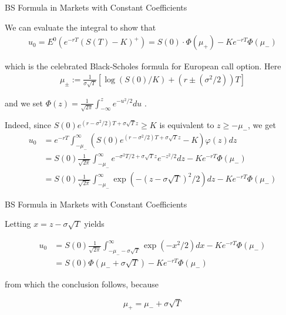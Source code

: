 \documentclass{beamer}
\begin{document}
\begin{frame}{BS Formula in Markets with Constant Coefficients}

    {\footnotesize \footnotesize
    \par We can evaluate the integral to show that
    \begin{align*}
        u_0 = E^0 \left( e^{-rT} (S(T) - K)^+ \right) = S(0) \cdot \Phi(\mu_+) - Ke^{-rT} \Phi(\mu_-)
    \end{align*}
    \par which is the celebrated Black-Scholes formula for European call option. Here
    \begin{align*}
        \mu_{\pm} := \frac{1}{\sigma\sqrt{T}} [\log(S(0)/K) + (r \pm (\sigma^2/2))T]
    \end{align*}
    \par and we set \( \Phi(z) = \frac{1}{\sqrt{2\pi}} \int_{-\infty}^{z} e^{-u^2/2} du \) .
    \par  \pause Indeed, since \( S(0)e^{(r-\sigma^2/2)T+\sigma\sqrt{T}z} \geq K \) is equivalent to \( z \geq -\mu_- \), we get
    \begin{align*}
    u_0 &= e^{-rT} \int_{-\mu_-}^{\infty} \left( S(0)e^{(r-\sigma^2/2)T+\sigma\sqrt{T}z} - K \right) \varphi(z) dz \\
    &= S(0) \frac{1}{\sqrt{2\pi}} \int_{-\mu_-}^{\infty} e^{-\sigma^2T/2+\sigma\sqrt{T}z} e^{-z^2/2} dz - Ke^{-rT} \Phi(\mu_-) \\
    &= S(0) \frac{1}{\sqrt{2\pi}} \int_{-\mu_-}^{\infty} \exp \left( - \left( z - \sigma\sqrt{T} \right)^2 / 2 \right) dz - Ke^{-rT} \Phi(\mu_-)
\end{align*}
    }
    
\end{frame}



\begin{frame}{BS Formula in Markets with Constant Coefficients}

    {\footnotesize \footnotesize
    \par Letting \( x = z - \sigma\sqrt{T} \) yields

    \begin{align*}
    u_0 &= S(0) \frac{1}{\sqrt{2\pi}} \int_{-\mu_- - \sigma\sqrt{T}}^{\infty} \exp \left( -x^2 / 2 \right) dx - Ke^{-rT} \Phi(\mu_-) \\
    &= S(0) \Phi \left( \mu_- + \sigma\sqrt{T} \right) - Ke^{-rT} \Phi(\mu_-)
    \end{align*}

    \par  \pause from which the conclusion follows, because

\[\mu_+ = \mu_- + \sigma\sqrt{T}\]
    }
    
\end{frame}


    
\end{document}
